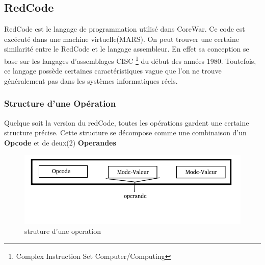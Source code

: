 \documentclass[12pt]{article}
\begin{document}
\subsection{RedCode}
RedCode est le langage de programmation utilisé dans CoreWar. Ce code est excécuté dans une machine virtuelle(MARS). On peut trouver une certaine similarité entre le RedCode et le langage assembleur. En effet sa conception se base sur les langages d'assemblages CISC \footnote{Complex Instruction Set Computer/Computing} du début des années 1980. Toutefois, ce langage possède certaines caractéristiques vague que l'on ne trouve généralement pas dans les systèmes informatiques réels.
\subsubsection{Structure d'une Opération}
Quelque soit la version du redCode, toutes les opérations gardent une certaine structure précise. Cette structure se décompose comme une combinaison d'un \textbf{Opcode} et de deux(2) \textbf{Operandes}
\begin{figure}[h!]
	\center
	\includegraphics[scale=0.5]{Images/structure-operation.png}
	\caption{struture d'une operation}
\end{figure}
\end{document}

